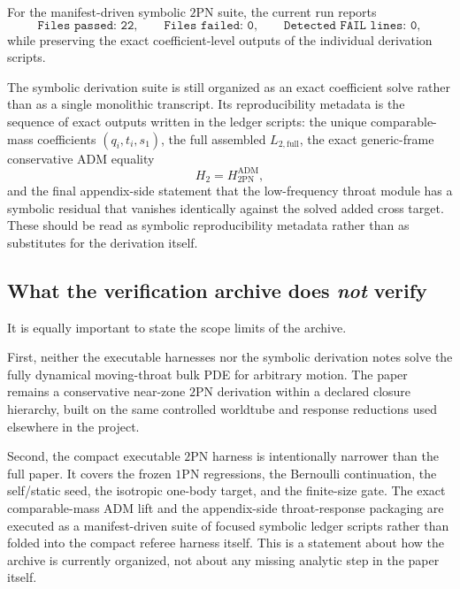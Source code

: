 \documentclass[11pt]{article}
\newcommand{\OnePN}{\mathrm{1PN}}
\newcommand{\TwoPN}{\mathrm{2PN}}
\newcommand{\ADM}{\mathrm{ADM}}
\begin{document}
For the manifest-driven symbolic \(\TwoPN\) suite, the current run reports
\begin{equation}
\texttt{Files passed: 22},
\qquad
\texttt{Files failed: 0},
\qquad
\texttt{Detected FAIL lines: 0},
\label{eq:verification-2pn-suite-counts}
\end{equation}
while preserving the exact coefficient-level outputs of the individual derivation
scripts.

The symbolic derivation suite is still organized as an exact coefficient solve rather than
as a single monolithic transcript.
Its reproducibility metadata is the sequence of exact outputs written in the ledger scripts:
the unique comparable-mass coefficients \((q_i,t_i,s_1)\), the full assembled
\(L_{2,\mathrm{full}}\), the exact generic-frame conservative \(\ADM\) equality
\begin{equation}
H_2=H^{\ADM}_{2\mathrm{PN}},
\label{eq:verification-adm-zero}
\end{equation}
and the final appendix-side statement that the low-frequency throat module has a symbolic
residual that vanishes identically against the solved added cross target.
These should be read as symbolic reproducibility metadata rather than as substitutes for
the derivation itself.

\subsection{What the verification archive does \emph{not} verify}
\label{sec:verification-scope}

It is equally important to state the scope limits of the archive.

First, neither the executable harnesses nor the symbolic derivation notes solve the fully
dynamical moving-throat bulk PDE for arbitrary motion.
The paper remains a conservative near-zone \(\TwoPN\) derivation within a declared closure
hierarchy, built on the same controlled worldtube and response reductions used elsewhere
in the project.

Second, the compact executable \(\TwoPN\) harness is intentionally narrower than the full
paper.
It covers the frozen \(\OnePN\) regressions, the Bernoulli continuation, the self/static
seed, the isotropic one-body target, and the finite-size gate.
The exact comparable-mass \(\ADM\) lift and the appendix-side throat-response packaging
are executed as a manifest-driven suite of focused symbolic ledger scripts rather than
folded into the compact referee harness itself.
This is a statement about how the archive is currently organized, not about any missing
analytic step in the paper itself.
\end{document}
